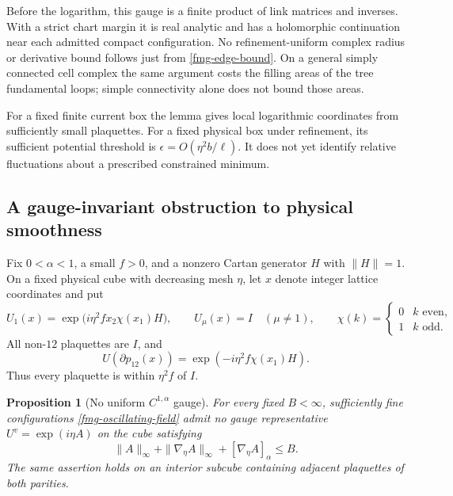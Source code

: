 \documentclass[11pt]{article}
\newtheorem{proposition}[theorem]{Proposition}
\theoremstyle{remark}
\begin{document}
Before the logarithm, this gauge is a finite product of link
matrices and inverses. With a strict chart margin it is real
analytic and has a holomorphic continuation near each admitted
compact configuration. No refinement-uniform complex radius
or derivative bound follows just from
\eqref{fmg-edge-bound}. On a general simply connected cell complex
the same argument costs the filling areas of the tree fundamental
loops; simple connectivity alone does not bound those areas.

For a fixed finite current box the lemma gives local logarithmic
coordinates from sufficiently small plaquettes. For a fixed
physical box under refinement, its sufficient potential threshold
is \(\epsilon=O(\eta^2 b/\ell)\). It does not yet identify relative
fluctuations about a prescribed constrained minimum.

\subsection{A gauge-invariant obstruction to physical smoothness}
\label{fmg-holder-obstruction}

Fix \(0<\alpha<1\), a small \(f>0\), and a nonzero Cartan
generator \(H\) with \(\|H\|=1\). On a fixed physical cube
with decreasing mesh \(\eta\), let \(x\) denote integer lattice
coordinates and put
\begin{equation}
 U_1(x)=\exp\!\bigl(i\eta^2 f x_2\chi(x_1)H\bigr),\qquad
 U_\mu(x)=I\quad(\mu\ne1),
 \qquad
 \chi(k)=\begin{cases}0&k\text{ even},\\1&k\text{ odd}.
                     \end{cases}
 \label{fmg-oscillating-field}
\end{equation}
All non-\(12\) plaquettes are \(I\), and
\begin{equation}
               U(\partial p_{12}(x))
                    =\exp(-i\eta^2 f\chi(x_1)H).
 \label{fmg-oscillating-curvature}
\end{equation}
Thus every plaquette is within \(\eta^2f\) of \(I\).

\begin{proposition}[No uniform \(C^{1,\alpha}\) gauge]
\label{fmg-no-smooth-gauge}
For every fixed \(B<\infty\), sufficiently fine configurations
\eqref{fmg-oscillating-field} admit no gauge representative
\(U^v=\exp(i\eta A)\) on the cube satisfying
\begin{equation}
 \|A\|_\infty+\|\nabla_\eta A\|_\infty
                         +[\nabla_\eta A]_\alpha\le B.
 \label{fmg-smooth-assumption}
\end{equation}
The same assertion holds on an interior subcube containing
adjacent plaquettes of both parities.
\end{proposition}
\end{document}
